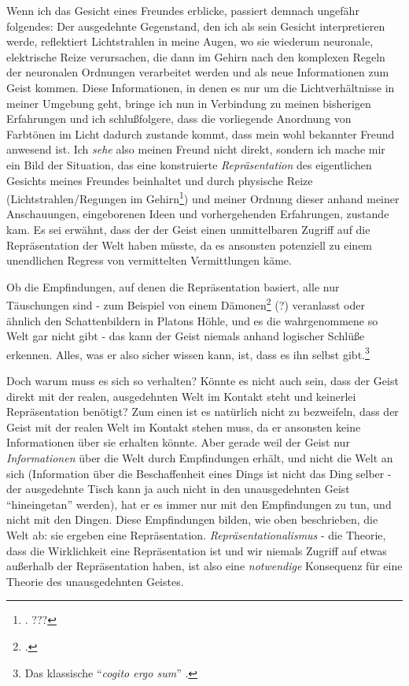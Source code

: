 \documentclass[a4paper, 12pt]{article}
\begin{document}
\begin{onehalfspace}
Wenn ich das Gesicht eines Freundes erblicke, passiert demnach ungefähr folgendes: Der ausgedehnte Gegenstand, den ich als sein Gesicht interpretieren werde, reflektiert Lichtstrahlen in meine Augen, wo sie wiederum neuronale, elektrische Reize verursachen, die dann im Gehirn nach den komplexen Regeln der neuronalen Ordnungen verarbeitet werden und als neue Informationen zum Geist kommen. Diese Informationen, in denen es nur um die Lichtverhältnisse in meiner Umgebung geht, bringe ich nun in Verbindung zu meinen bisherigen Erfahrungen und ich schlußfolgere, dass die vorliegende Anordnung von Farbtönen im Licht dadurch zustande kommt, dass mein wohl bekannter Freund anwesend ist. Ich \emph{sehe} also meinen Freund nicht direkt, sondern ich mache mir ein Bild der Situation, das eine konstruierte \emph{Repräsentation} des eigentlichen Gesichts meines Freundes beinhaltet und durch physische Reize (Lichtstrahlen/Regungen im Gehirn\footnote{\Cite[Vgl.][S. 270f.]{scheler-idole}. ???}) und meiner Ordnung dieser anhand meiner Anschauungen, eingeborenen Ideen und vorhergehenden Erfahrungen, zustande kam. Es sei erwähnt, dass der der Geist einen unmittelbaren Zugriff auf die Repräsentation der Welt haben müsste, da es ansonsten potenziell zu einem unendlichen Regress von vermittelten Vermittlungen käme.

Ob die Empfindungen, auf denen die Repräsentation basiert, alle nur Täuschungen sind - zum Beispiel von einem Dämonen\footnote{\Cite[Vgl.][S.?]{descartes}.} (?) veranlasst oder ähnlich den Schattenbildern in Platons Höhle, und es die wahrgenommene so Welt gar nicht gibt - das kann der Geist niemals anhand logischer Schlüße erkennen. Alles, was er also sicher wissen kann, ist, dass es ihn selbst gibt.\footnote{Das klassische "`\emph{cogito ergo sum}"' .} 

Doch warum muss es sich so verhalten? Könnte es nicht auch sein, dass der Geist direkt mit der realen, ausgedehnten Welt im Kontakt steht und keinerlei Repräsentation benötigt? Zum einen ist es natürlich nicht zu bezweifeln, dass der Geist mit der realen Welt im Kontakt stehen muss, da er ansonsten keine Informationen über sie erhalten könnte. Aber gerade weil der Geist nur \emph{Informationen} über die Welt durch Empfindungen erhält, und nicht die Welt an sich (Information über die Beschaffenheit eines Dings ist nicht das Ding selber - der ausgedehnte Tisch kann ja auch nicht in den unausgedehnten Geist "`hineingetan"' werden), hat er es immer nur mit den Empfindungen zu tun, und nicht mit den Dingen. Diese Empfindungen bilden, wie oben beschrieben, die Welt ab: sie ergeben eine Repräsentation. \emph{Repräsentationalismus} - die Theorie, dass die Wirklichkeit eine Repräsentation ist und wir niemals Zugriff auf etwas außerhalb der Repräsentation haben, ist also eine \emph{notwendige} Konsequenz für eine Theorie des unausgedehnten Geistes.



\end{onehalfspace}
\end{document}
